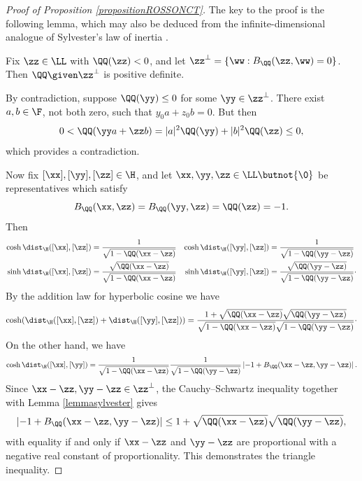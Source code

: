\begin{proof}[Proof of Proposition \ref{propositionROSSONCT}]
The key to the proof is the following lemma, which may also be deduced from the infinite-dimensional analogue of Sylvester's law of inertia \cite[Lemma 3]{Maddocks}.
\begin{lemma}
\label{lemmasylvester}
Fix $\zz\in\LL$ with $\QQ(\zz) < 0$, and let $\zz^\perp = \{\ww : B_\QQ(\zz,\ww) = 0\}$. Then $\QQ\given\zz^\perp$ is positive definite.
\end{lemma}
\begin{subproof}
By contradiction, suppose $\QQ(\yy) \leq 0$ for some $\yy\in\zz^\perp$. There exist $a,b\in\F$, not both zero, such that $y_0 a + z_0 b = 0$. But then
\[
0 < \QQ(\yy a + \zz b) = |a|^2\QQ(\yy) + |b|^2\QQ(\zz) \leq 0,
\]
which provides a contradiction.
\end{subproof}

Now fix $[\xx],[\yy],[\zz]\in\H$, and let $\xx,\yy,\zz\in\LL\butnot\{\0\}$ be representatives which satisfy
\[
B_\QQ(\xx,\zz) = B_\QQ(\yy,\zz) = \QQ(\zz) = -1.
\]
Then
\begin{align*}
\cosh\dist_\H([\xx],[\zz]) &= \frac{1}{\sqrt{1 - \QQ(\xx - \zz)}} &
\cosh\dist_\H([\yy],[\zz]) &= \frac{1}{\sqrt{1 - \QQ(\yy - \zz)}}\\
\sinh\dist_\H([\xx],[\zz]) &= \frac{\sqrt{\QQ(\xx - \zz)}}{\sqrt{1 - \QQ(\xx - \zz)}} &
\sinh\dist_\H([\yy],[\zz]) &= \frac{\sqrt{\QQ(\yy - \zz)}}{\sqrt{1 - \QQ(\yy - \zz)}}\cdot
\end{align*}
By the addition law for hyperbolic cosine we have
\[
\cosh(\dist_\H([\xx],[\zz]) + \dist_\H([\yy],[\zz])) = \frac{1 + \sqrt{\QQ(\xx - \zz)}\sqrt{\QQ(\yy - \zz)}}{\sqrt{1 - \QQ(\xx - \zz)}\sqrt{1 - \QQ(\yy - \zz)}} \cdot
\]
On the other hand, we have
\[
\cosh\dist_\H([\xx],[\yy]) = \frac{1}{\sqrt{1 - \QQ(\xx - \zz)}}\frac{1}{\sqrt{1 - \QQ(\yy - \zz)}}\left|-1 + B_\QQ(\xx - \zz,\yy - \zz)\right|.
\]
Since $\xx - \zz,\yy - \zz\in\zz^\perp$, the Cauchy--Schwartz inequality together with Lemma \ref{lemmasylvester} gives
\[
\left|-1 + B_\QQ(\xx - \zz,\yy - \zz)\right| \leq 1 + \sqrt{\QQ(\xx - \zz)}\sqrt{\QQ(\yy - \zz)},
\]
with equality if and only if $\xx - \zz$ and $\yy - \zz$ are proportional with a negative real constant of proportionality. This demonstrates the triangle inequality.


\end{proof}
